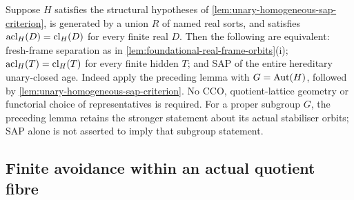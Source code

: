 \begin{remark}
\label{rem:typed-fresh-frame-iff-sap}
Suppose $H$ satisfies the structural hypotheses of
\cref{lem:unary-homogeneous-sap-criterion}, is generated by a union $R$
of named real sorts, and satisfies
$\operatorname{acl}_H(D)=\operatorname{cl}_H(D)$ for every finite real $D$.
Then the following are equivalent: fresh-frame separation as in
\cref{lem:foundational-real-frame-orbits}(i);
$\operatorname{acl}_H(T)=\operatorname{cl}_H(T)$ for every finite hidden $T$;
and SAP of the entire hereditary unary-closed age.
Indeed apply the preceding lemma with $G=\operatorname{Aut}(H)$, followed by
\cref{lem:unary-homogeneous-sap-criterion}. No CCO, quotient-lattice
geometry or functorial choice of representatives is required. For a
proper subgroup $G$, the preceding lemma retains the stronger statement
about its actual stabiliser orbits; SAP alone is not asserted to imply
that subgroup statement.
\end{remark}

\subsection{Finite avoidance within an actual quotient fibre}

